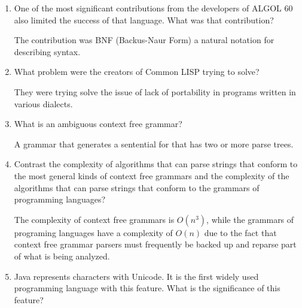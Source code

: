 \begin{enumerate}
\begin{answer}
    \end{answer}


  \item One of the most significant contributions from the developers
    of ALGOL 60 also limited the success of that language. What was
    that contribution?

  \begin{answer}

  The contribution was BNF (Backus-Naur Form) a natural notation for
  describing syntax.

    \end{answer}

  \item What problem were the creators of Common LISP trying to solve?

  \begin{answer}

    They were trying solve the issue of lack of portability in
    programs written in various dialects.

    \end{answer}

  \item What is an ambiguous context free grammar?

  \begin{answer}

   A grammar that generates a sentential for that has two or more parse trees.

    \end{answer}

  \item Contrast the complexity of algorithms that can parse strings
    that conform to the most general kinds of context free grammars
    and the complexity of the algorithms that can parse strings that
    conform to the grammars of programming languages?

  \begin{answer}

    The complexity of context free grammars is $O(n^3)$, while the
    grammars of programing languages have a complexity of $O(n)$ due to
    the fact that context free grammar parsers must frequently be
    backed up and reparse part of what is being analyzed.

    \end{answer}

  \item Java represents characters with Unicode. It is the first
    widely used programming language with this feature. What is the
    significance of this feature?


\end{enumerate}
